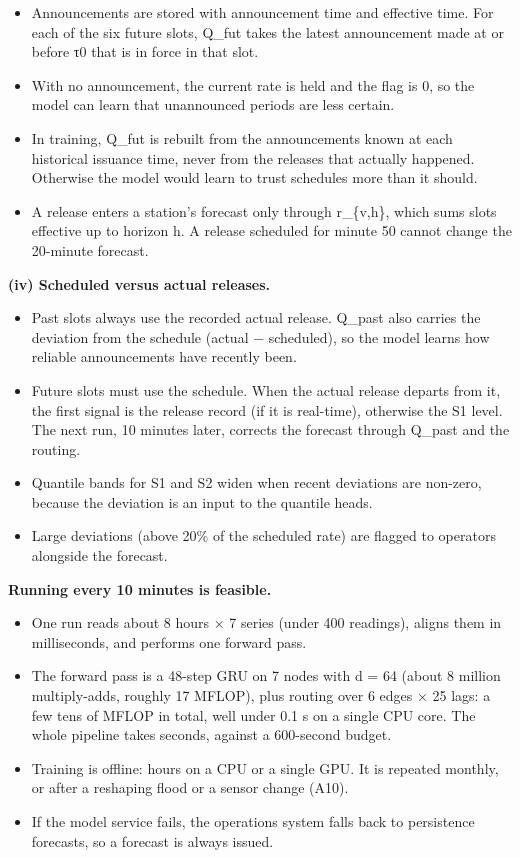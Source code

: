 \documentclass[11pt]{article}
\providecommand{\tightlist}{}
\begin{document}
\begin{itemize}
\tightlist
\item
  Announcements are stored with announcement time and effective time. For each of the six future slots, Q\_fut takes the latest announcement made at or before τ0 that is in force in that slot.
\item
  With no announcement, the current rate is held and the flag is 0, so the model can learn that unannounced periods are less certain.
\item
  In training, Q\_fut is rebuilt from the announcements known at each historical issuance time, never from the releases that actually happened. Otherwise the model would learn to trust schedules more than it should.
\item
  A release enters a station's forecast only through r\_\{v,h\}, which sums slots effective up to horizon h. A release scheduled for minute 50 cannot change the 20-minute forecast.
\end{itemize}

\textbf{(iv) Scheduled versus actual releases.}

\begin{itemize}
\tightlist
\item
  Past slots always use the recorded actual release. Q\_past also carries the deviation from the schedule (actual − scheduled), so the model learns how reliable announcements have recently been.
\item
  Future slots must use the schedule. When the actual release departs from it, the first signal is the release record (if it is real-time), otherwise the S1 level. The next run, 10 minutes later, corrects the forecast through Q\_past and the routing.
\item
  Quantile bands for S1 and S2 widen when recent deviations are non-zero, because the deviation is an input to the quantile heads.
\item
  Large deviations (above 20\% of the scheduled rate) are flagged to operators alongside the forecast.
\end{itemize}

\textbf{Running every 10 minutes is feasible.}

\begin{itemize}
\tightlist
\item
  One run reads about 8 hours × 7 series (under 400 readings), aligns them in milliseconds, and performs one forward pass.
\item
  The forward pass is a 48-step GRU on 7 nodes with d = 64 (about 8 million multiply-adds, roughly 17 MFLOP), plus routing over 6 edges × 25 lags: a few tens of MFLOP in total, well under 0.1 s on a single CPU core. The whole pipeline takes seconds, against a 600-second budget.
\item
  Training is offline: hours on a CPU or a single GPU. It is repeated monthly, or after a reshaping flood or a sensor change (A10).
\item
  If the model service fails, the operations system falls back to persistence forecasts, so a forecast is always issued.
\end{itemize}
\end{document}
